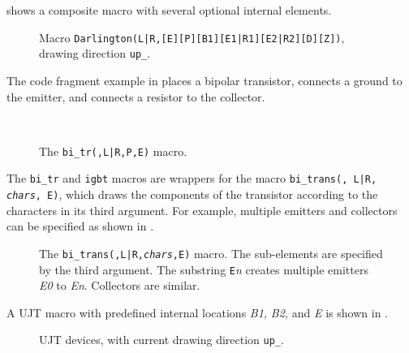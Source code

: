  shows a composite macro with several optional internal elements.
\begin{figure}[H]
   
   \caption{Macro {\tt Darlington(L|R,[E][P][B1][E1|R1][E2|R2][D][Z])},
     drawing direction {\tt up\_}.}
   \label{Darlington}
   \end{figure}

The code fragment example in  places a bipolar transistor,
connects a ground to the emitter, and connects a resistor to the collector.
\begin{figure}[H]
   \quad\quad\parbox{4in}{\small }%
   \quad\raise-0.4in\hbox{ }%
   \vspace{-\baselineskip}
   \caption{The {\tt bi\_tr(\linespec,L|R,P,E)} macro.}
   \label{bitr}
   \end{figure}

The {\tt bi\_tr} and {\tt igbt} macros are wrappers for
the macro {\tt bi\_trans(\linespec, L|R, {\sl chars}, E)}, which
draws the components of the transistor according to the characters in its
third argument.  For example, multiple emitters and collectors can be
specified as shown in .
\begin{figure}[H]
   
   \caption{The {\tt bi\_trans(\linespec,L|R,{\sl chars},E)} macro.
   The sub-elements are specified by the third argument.  The substring
   {\tt E}{\sl n} creates multiple emitters {\sl E0} to {\sl En}.
   Collectors are similar.}
   \label{bitrans}
   \end{figure}

A UJT macro with predefined internal locations {\sl B1,} {\sl B2,}
and {\sl E} is shown in .
\begin{figure}[H]
   
   \caption{UJT devices, with current drawing direction {\tt up\_}. }
   \label{ujt}
   \end{figure}

